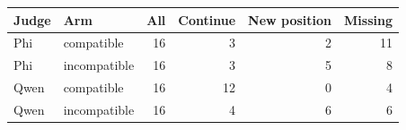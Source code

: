 \begin{tabular}{llrrrr}
\toprule
Judge & Arm & All & Continue & New position & Missing \\
\midrule
Phi & compatible & 16 & 3 & 2 & 11 \\
Phi & incompatible & 16 & 3 & 5 & 8 \\
Qwen & compatible & 16 & 12 & 0 & 4 \\
Qwen & incompatible & 16 & 4 & 6 & 6 \\
\bottomrule
\end{tabular}